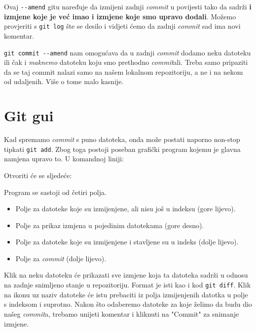 
Ovaj \verb+--amend+ gitu naređuje da izmijeni zadnji \emph{commit} u povijesti tako da sadrži \textbf{i izmjene koje je već imao i izmjene koje smo upravo dodali}.
Možemo provjeriti s \verb+git log+ šte se desilo i vidjeti ćemo da zadnji \emph{commit} sad ima novi komentar.

\verb+git commit --amend+ nam omogućava da u zadnji \emph{commit} dodamo neku datoteku ili čak i \emph{maknemo} datoteku koju smo prethodno \emph{commit}ali. 
Treba samo pripaziti da se taj commit nalazi samo na našem lokalnom repozitoriju, a ne i na nekom od udaljenih. 
Više o tome malo kasnije.

\section*{Git gui}

Kad spremamo \emph{commit} s puno datoteka, onda može postati naporno non-stop tipkati \verb+git add+.
Zbog toga postoji poseban grafički program kojemu je glavna namjena upravo to.
U komandnoj liniji:


Otvoriti će se sljedeće:


Program se sastoji od četiri polja. 

\begin{itemize}
	\item Polje za datoteke koje su izmijenjene, ali nisu još u indeksu (gore lijevo).
	\item Polje za prikaz izmjena u pojedinim datotekama (gore desno). 
	\item Polje za datoteke koje su izmijenjene i stavljene su u indeks (dolje lijevo).
	\item Polje za \emph{commit} (dolje lijevo).
\end{itemize}

Klik na neku datoteku će prikazati sve izmjene koja ta datoteka sadrži u odnosu na zadnje snimljeno stanje u repozitoriju.
Format je isti kao i kod \verb+git diff+.
Klik na ikonu uz naziv datoteke će istu prebaciti iz polja izmijenjenih datotka u polje s indeksom i suprotno.
Nakon što odaberemo datoteke za koje želimo da budu dio našeg \emph{commit}a, trebamo unijeti komentar i kliknuti na "Commit" za snimanje izmjene.

